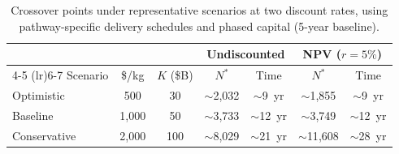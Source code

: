 \begin{table}[htbp]
\centering
\caption{Crossover points under representative scenarios at two discount rates, using pathway-specific delivery schedules and phased capital (5-year baseline).}
\label{tab:scenarios}
\small
\begin{tabular}{@{}lcccccc@{}}
\toprule
 & & & \multicolumn{2}{c}{Undiscounted} & \multicolumn{2}{c}{NPV ($r = 5\%$)} \\
\cmidrule(lr){4-5} \cmidrule(lr){6-7}
Scenario & \$/kg & $K$ (\$B) & $N^*$ & Time & $N^*$ & Time \\
\midrule
Optimistic   & 500     & 30  & $\sim$2{,}032 & $\sim$9~yr  & $\sim$1{,}855 & $\sim$9~yr \\
Baseline     & 1{,}000 & 50  & $\sim$3{,}733 & $\sim$12~yr & $\sim$3{,}749 & $\sim$12~yr \\
Conservative & 2{,}000 & 100 & $\sim$8{,}029 & $\sim$21~yr & $\sim$11{,}608 & $\sim$28~yr \\
\bottomrule
\end{tabular}
\end{table}

